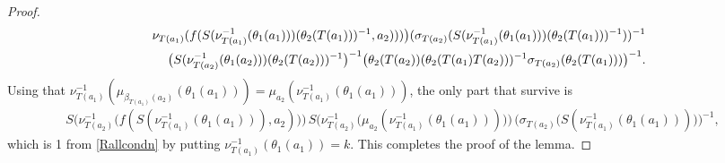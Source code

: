 \documentclass[10pt,a4paper]{amsart}
\begin{document}
\begin{proof}
\begin{eqnarray*}
		&&  \nu_{T(a_1)}(f(S(\nu^{-1}_{T(a_1)}(\theta_1(a_1)))(\theta_2(T(a_1)))^{-1}, a_2 ))) \big)  (\sigma_{T(a_2)}(S(\nu^{-1}_{T(a_1)}(\theta_1(a_1)))(\theta_2(T(a_1)))^{-1}))^{-1}\notag\\   
		&&	\big(S(\nu^{-1}_{T(a_2)}(\theta_1(a_2)))(\theta_2(T(a_2)))^{-1}\big)^{-1} \big( \theta_2(T(a_2))(\theta_2(T(a_1) T(a_2)))^{-1}\sigma_{T(a_2)}(\theta_2(T(a_1))) \big)^{-1}.
	\end{eqnarray*}
	Using that $\nu^{-1}_{T(a_1)}(\mu_{\beta_{T(a_1)}(a_2)}(\theta_1(a_1)))= \mu_{a_2}(\nu^{-1}_{T(a_1)}(\theta_1(a_1)))$, the only part that survive is  
	\begin{align*}
		S\big(\nu^{-1}_{T(a_2)} \big(f(S(\nu^{-1}_{T(a_1)}(\theta_1(a_1))), a_2) \big)\big)\, S\big(\nu^{-1}_{T(a_2)} \big(\mu_{a_2}(\nu^{-1}_{T(a_1)}(\theta_1(a_1))) \big)\big) \,\big(\sigma_{T(a_2)} \big(S(\nu^{-1}_{T(a_1)}(\theta_1(a_1))) \big)\big)^{-1},
	\end{align*}
	which is 1 from \eqref{Rallcondn}  by putting $\nu^{-1}_{T(a_1)}(\theta_1(a_1))=k$. This completes the proof of the lemma.
\end{proof}
\end{document}
